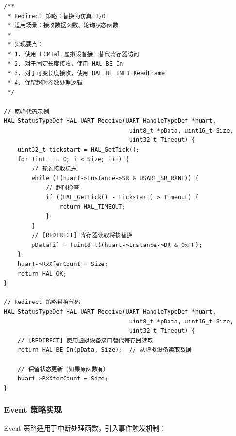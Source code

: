 \begin{lstlisting}[style=CStyle,abovecaptionskip=0pt,belowcaptionskip=0pt]
/**
 * Redirect 策略：替换为仿真 I/O
 * 适用场景：接收数据函数、轮询状态函数
 *
 * 实现要点：
 * 1. 使用 LCMHal 虚拟设备接口替代寄存器访问
 * 2. 对于固定长度接收，使用 HAL_BE_In
 * 3. 对于可变长度接收，使用 HAL_BE_ENET_ReadFrame
 * 4. 保留超时参数处理逻辑
 */

// 原始代码示例
HAL_StatusTypeDef HAL_UART_Receive(UART_HandleTypeDef *huart,
                                    uint8_t *pData, uint16_t Size,
                                    uint32_t Timeout) {
    uint32_t tickstart = HAL_GetTick();
    for (int i = 0; i < Size; i++) {
        // 轮询接收标志
        while (!(huart->Instance->SR & USART_SR_RXNE)) {
            // 超时检查
            if ((HAL_GetTick() - tickstart) > Timeout) {
                return HAL_TIMEOUT;
            }
        }
        // [REDIRECT] 寄存器读取将被替换
        pData[i] = (uint8_t)(huart->Instance->DR & 0xFF);
    }
    huart->RxXferCount = Size;
    return HAL_OK;
}

// Redirect 策略替换代码
HAL_StatusTypeDef HAL_UART_Receive(UART_HandleTypeDef *huart,
                                    uint8_t *pData, uint16_t Size,
                                    uint32_t Timeout) {
    // [REDIRECT] 使用虚拟设备接口替代寄存器读取
    return HAL_BE_In(pData, Size);  // 从虚拟设备读取数据
    
    // 保留状态更新（如果原函数有）
    huart->RxXferCount = Size;
}
\end{lstlisting}

\subsubsection{Event 策略实现}

Event 策略适用于中断处理函数，引入事件触发机制：

